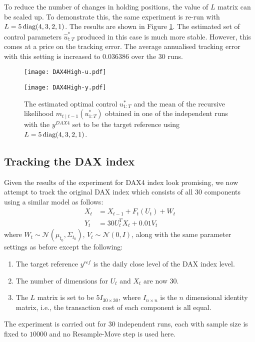 To reduce the number of changes in holding positions, the value of $L$ matrix can be scaled up. To demonstrate this, the same experiment is re-run with $L = 5\operatorname{diag}(4,3,2,1)$. The results are shown in Figure \ref{fig:dax42}. The estimated set of control parameters $\hat{u}^*_{!:T}$ produced in this case is much more stable. However, this comes at a price on the tracking error. The average annualised tracking error with this setting is increased to $0.036386$ over the $30$ runs. 

\begin{figure}[htbp]
\centering
    \begin{minipage}{0.5\textwidth}
        \centering
        \texttt{[image: DAX4High-u.pdf]}
    \end{minipage}%
    \begin{minipage}{0.5\textwidth}
        \centering
        \texttt{[image: DAX4High-y.pdf]}
    \end{minipage}
\caption{The estimated optimal control $u^*_{1:T}$ and the mean of the recursive likelihood $m_{t \mid t-1}(u^*_{1:T})$ obtained in one of the independent runs with the $y^{DAX4}$ set to be the target reference using $L = 5\operatorname{diag}(4,3,2,1)$.}
\label{fig:dax42}
\end{figure}

\subsection{Tracking the DAX index}
Given the results of the experiment for DAX4 index look promising, we now attempt to track the original DAX index which consists of all $30$ components using a similar model as follows:
\begin{align}
  X_t &= X_{t-1} + F_t(U_t) + W_t \\
  Y_t &= 30U^T_tX_t + 0.01V_t
\end{align}
where $W_t \sim \mathcal{N}(\mu_{t_0}, \Sigma_{t_0})$, $V_t \sim \mathcal{N}(0, I)$, along with the same parameter settings as before except the following:
\begin{enumerate}
\item The target reference $y^{ref}$ is the daily close level of the DAX index level.
\item The number of dimensions for $U_t$ and $X_t$ are now $30$.
\item The $L$ matrix is set to be $5I_{30 \times 30}$, where $I_{n \times n}$ is the $n$ dimensional identity matrix, i.e., the transaction cost of each component is all equal.
\end{enumerate}
The experiment is carried out for $30$ independent runs, each with sample size is fixed to $10000$ and no Resample-Move step is used here.

